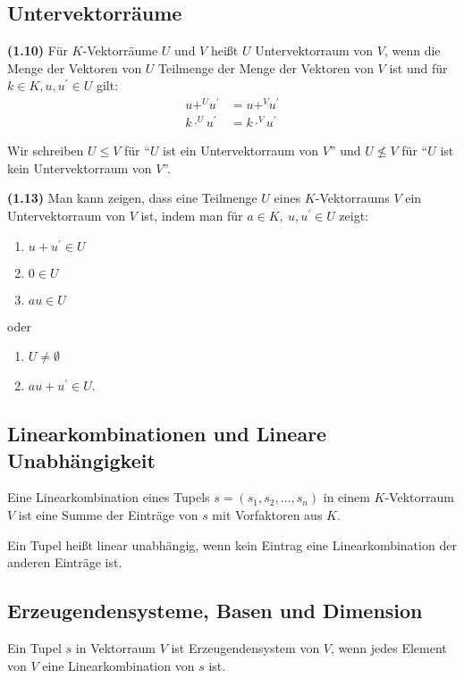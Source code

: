 \documentclass[a4paper,parskip=half*,DIV=15,fontsize=11pt]{scrartcl}
\newlength{\hangwidth}
\newcommand{\skript}[1]{\settowidth{\hangwidth}{\textbf{(#1)} }\hangpara{\hangwidth}{1}\textbf{(#1)} \ignorespaces} %
\begin{document}
\subsection{Untervektorräume}

\skript{1.10} Für $K$-Vektorräume $U$ und $V$ heißt $U$ Untervektorraum von $V$, wenn die Menge der Vektoren von $U$ Teilmenge der Menge der Vektoren von $V$ ist und für $k \in K, u,u^\prime \in U$ gilt:
\begin{align*}
	u {+}^{U} u^\prime &= u {+}^{V} u^\prime	\\
	k \cdot^{U} u^\prime &= k \cdot^{V} u^\prime
\end{align*}

Wir schreiben $U \leq V$ für ``$U$ ist ein Untervektorraum von $V$'' und $U \nleq V$ für ``$U$ ist kein Untervektorraum von $V$''.

\skript{1.13} Man kann zeigen, dass eine Teilmenge $U$ eines $K$-Vektorraums $V$ ein Untervektorraum von $V$ ist, indem man für $a \in K,\ u,u^\prime \in U$ zeigt:
\begin{enumerate}
	\item $u+u^\prime \in U$
	\item $0 \in U$
	\item $au \in U$
\end{enumerate}
oder
\begin{enumerate}
	\item $U \neq \emptyset$
	\item $au+u^\prime \in U$.
\end{enumerate}

\subsection{Linearkombinationen und Lineare Unabhängigkeit}

Eine Linearkombination eines Tupels $s = (s_1,s_2, \ldots, s_n)$ in einem $K$-Vektorraum $V$ ist eine Summe der Einträge von $s$ mit Vorfaktoren aus $K$.

Ein Tupel heißt linear unabhängig, wenn kein Eintrag eine Linearkombination der anderen Einträge ist.

\subsection{Erzeugendensysteme, Basen und Dimension}

Ein Tupel $s$ in Vektorraum $V$ ist Erzeugendensystem von $V$, wenn jedes Element von $V$ eine Linearkombination von $s$ ist.
\end{document}
